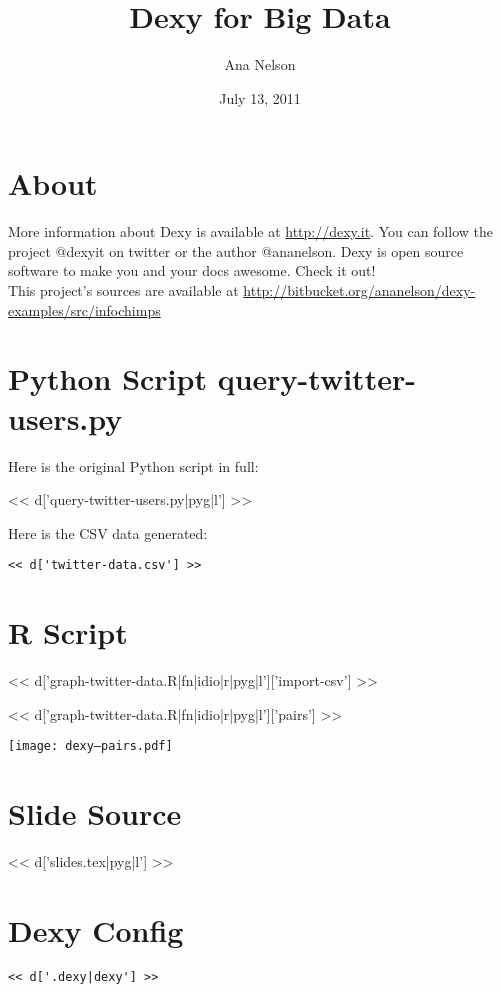 \documentclass[a4paper]{tufte-handout}
\title{Dexy for Big Data}
\author{Ana Nelson}
\date{July 13, 2011}
\begin{document}
\maketitle

\section{About}
More information about Dexy is available at \url{http://dexy.it}. You can follow the project @dexyit on twitter or the author @ananelson. Dexy is open source software to make you and your docs awesome. Check it out!
\\This project's sources are available at \url{http://bitbucket.org/ananelson/dexy-examples/src/infochimps}

\section{Python Script query-twitter-users.py}

Here is the original Python script in full:

\scriptsize
<< d['query-twitter-users.py|pyg|l'] >>
\normalsize

Here is the CSV data generated:
\scriptsize
\begin{Verbatim}
<< d['twitter-data.csv'] >>
\end{Verbatim}
\normalsize

\section{R Script}

\scriptsize
<< d['graph-twitter-data.R|fn|idio|r|pyg|l']['import-csv'] >>
\normalsize

\scriptsize
<< d['graph-twitter-data.R|fn|idio|r|pyg|l']['pairs'] >>
\normalsize

\texttt{[image: dexy--pairs.pdf]}

\section{Slide Source}

\scriptsize
<< d['slides.tex|pyg|l'] >>
\normalsize

\section{Dexy Config}
\scriptsize
\begin{Verbatim}
<< d['.dexy|dexy'] >>
\end{Verbatim}
\normalsize
\end{document}
